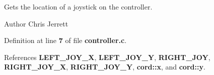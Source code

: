 Gets the location of a joystick on the controller. 

\begin{DoxyAuthor}{Author}
Chris Jerrett 
\end{DoxyAuthor}


Definition at line \textbf{ 7} of file \textbf{ controller.\+c}.



References \textbf{ L\+E\+F\+T\+\_\+\+J\+O\+Y\+\_\+X}, \textbf{ L\+E\+F\+T\+\_\+\+J\+O\+Y\+\_\+Y}, \textbf{ R\+I\+G\+H\+T\+\_\+\+J\+OY}, \textbf{ R\+I\+G\+H\+T\+\_\+\+J\+O\+Y\+\_\+X}, \textbf{ R\+I\+G\+H\+T\+\_\+\+J\+O\+Y\+\_\+Y}, \textbf{ cord\+::x}, and \textbf{ cord\+::y}.

